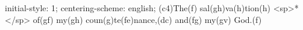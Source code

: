 initial-style: 1;
centering-scheme: english;
(c4)The(f) sal(gh)va(h)tion(h) <sp>*</sp> of(gf) my(gh) coun(g)te(fe)nance,(dc) and(fg) my(gv) God.(f)
